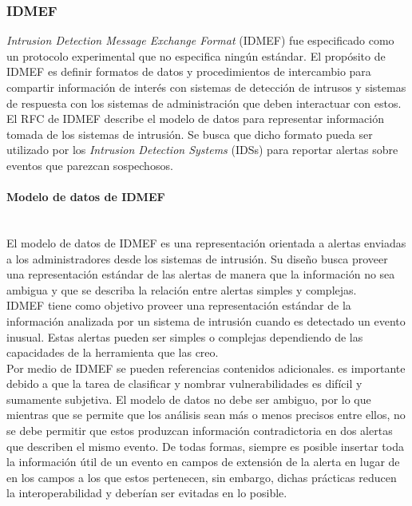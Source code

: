 \subsubsection{IDMEF}

\textit{Intrusion Detection Message Exchange Format} (IDMEF) fue especificado como un 
protocolo experimental que no especifica ningún estándar. El propósito de 
IDMEF es definir formatos de datos y procedimientos de intercambio para 
compartir información de interés con sistemas de detección de intrusos y 
sistemas de respuesta con los sistemas de administración que deben 
interactuar con estos. El RFC de IDMEF describe el modelo de datos para 
representar información tomada de los sistemas de intrusión. Se busca que dicho 
formato pueda ser utilizado por los \textit{Intrusion Detection Systems} (IDSs) para 
reportar alertas sobre eventos que parezcan sospechosos.\\

\paragraph{Modelo de datos de IDMEF}\ \\
El modelo de datos de IDMEF es una representación orientada a alertas enviadas a 
los administradores desde los sistemas de intrusión. Su diseño busca proveer una representación estándar de las 
alertas de manera que la información no sea ambigua y que se describa la 
relación entre alertas simples y complejas.\\

IDMEF tiene como objetivo proveer una representación estándar de la 
información analizada por un sistema de intrusión cuando es detectado 
un evento inusual. Estas alertas pueden ser simples o complejas 
dependiendo de las capacidades de la herramienta que las creo.\\

Por medio de IDMEF se pueden referencias contenidos adicionales.
es importante debido a que la tarea de clasificar y nombrar vulnerabilidades es 
difícil y sumamente subjetiva. El modelo de datos no debe ser ambiguo, por lo 
que mientras que se permite que los análisis sean más o menos precisos 
entre ellos, no se debe permitir que estos produzcan información contradictoria  
en dos alertas que describen el mismo evento. De todas formas, siempre es 
posible insertar toda la información útil de un evento en campos de extensión 
de la alerta en lugar de en los campos a los que estos pertenecen, sin embargo, 
dichas prácticas reducen la interoperabilidad y deberían ser evitadas en lo 
posible.


